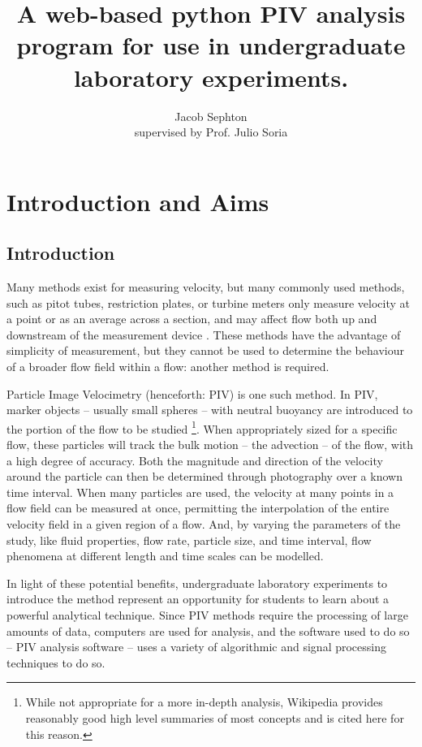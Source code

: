 \documentclass[12pt, a4paper]{amsart}
\title[Undergraduate PIV analysis program]{A web-based python PIV analysis program for use in undergraduate laboratory experiments.}
\author[Jacob Sephton]{Jacob Sephton\\ supervised by Prof. Julio Soria}
\begin{document}
\maketitle

\section{Introduction and Aims}
\subsection{Introduction}
Many methods exist for measuring velocity, but many commonly used methods, such as pitot tubes, restriction plates, or turbine meters only measure velocity at a point or as an average across a section, and may affect flow both up and downstream of the measurement device \citep[pp. 109, 469]{munson}. These methods have the advantage of simplicity of measurement, but they cannot be used to determine the behaviour of a broader flow field within a flow: another method is required. 

Particle Image Velocimetry (henceforth: PIV) is one such method. In PIV, marker objects -- usually small spheres -- with neutral buoyancy are introduced to the portion of the flow to be studied \citep{wikipiv}\footnote{While not appropriate for a more in-depth analysis, Wikipedia provides reasonably good high level summaries of most concepts and is cited here for this reason.}. When appropriately sized for a specific flow, these particles will track the bulk motion -- the advection -- of the flow, with a high degree of accuracy. Both the magnitude and direction of the velocity around the particle can then be determined through photography over a known time interval. When many particles are used, the velocity at many points in a flow field can be measured at once, permitting the interpolation of the entire velocity field in a given region of a flow. And, by varying the parameters of the study, like fluid properties, flow rate, particle size, and time interval, flow phenomena at different length and time scales can be modelled. 

In light of these potential benefits, undergraduate laboratory experiments to introduce the method represent an opportunity for students to learn about a powerful analytical technique. Since PIV methods require the processing of large amounts of data, computers are used for analysis, and the software used to do so -- PIV analysis software -- uses a variety of algorithmic and signal processing techniques to do so.
\end{document}
